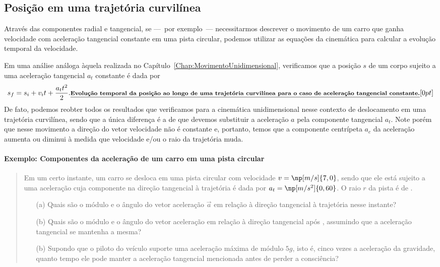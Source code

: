 \subsection{Posição em uma trajetória curvilínea}

Através das componentes radial e tangencial, se ---~por exemplo~--- necessitarmos descrever o movimento de um carro que ganha velocidade com aceleração tangencial constante em uma pista circular, podemos utilizar as equações da cinemática para calcular a evolução temporal da velocidade.

Em uma análise análoga àquela realizada no Capítulo~\ref{Chap:MovimentoUnidimensional}, verificamos que a posição $s$ de um corpo sujeito a uma aceleração tangencial $a_t$ constante é dada por
\begin{equation}
  s_f = s_i + v_i t + \frac{a_t t^2}{2}.\relax{\footnotesize\emph{\textbf{Evolução temporal da posição ao longo de uma trajetória curvilínea para o caso de aceleração tangencial constante.}}}[0pt]
\end{equation}
%
De fato, podemos reobter todos os resultados que verificamos para a cinemática unidimensional nesse contexto de deslocamento em uma trajetória curvilínea, sendo que a única diferença é a de que devemos substituir a aceleração $a$ pela componente tangencial $a_t$. Note porém que nesse movimento a direção do vetor  velocidade não é constante e, portanto, temos que a componente centrípeta $a_c$ da aceleração aumenta ou diminui à medida que velocidade e/ou o raio da trajetória muda.

\paragraph{Exemplo: Componentes da aceleração de um carro em uma pista circular}

\begin{quote}
Em um certo instante, um carro se desloca em uma pista circular com velocidade $v = \np[m/s]{7,0}$, sendo que ele está sujeito a uma aceleração cuja componente na direção tangencial à trajetória é dada por $a_t = \np[m/s^2]{0,60}$. O raio $r$ da pista é de .
\begin{itemize}
	\item[(a)] Quais são o módulo e o ângulo do vetor aceleração $\vec{a}$ em relação à direção tangencial à trajetória nesse instante?
	\item[(b)] Quais são o módulo e o ângulo do vetor aceleração em relação à direção tangencial após , assumindo que a aceleração tangencial se mantenha a mesma?
	\item[(b)] Supondo que o piloto do veículo suporte uma aceleração máxima de módulo $5g$, isto é, cinco vezes a aceleração da gravidade, quanto tempo ele pode manter a aceleração tangencial mencionada antes de perder a consciência?
\end{itemize}
\end{quote}

